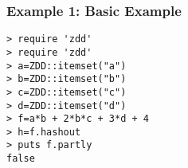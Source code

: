 \subsubsection*{Example 1: Basic Example}



\begin{Verbatim}[baselinestretch=0.7,frame=single]
> require 'zdd'
> require 'zdd'
> a=ZDD::itemset("a")
> b=ZDD::itemset("b")
> c=ZDD::itemset("c")
> d=ZDD::itemset("d")
> f=a*b + 2*b*c + 3*d + 4
> h=f.hashout
> puts f.partly
false
\end{Verbatim}
